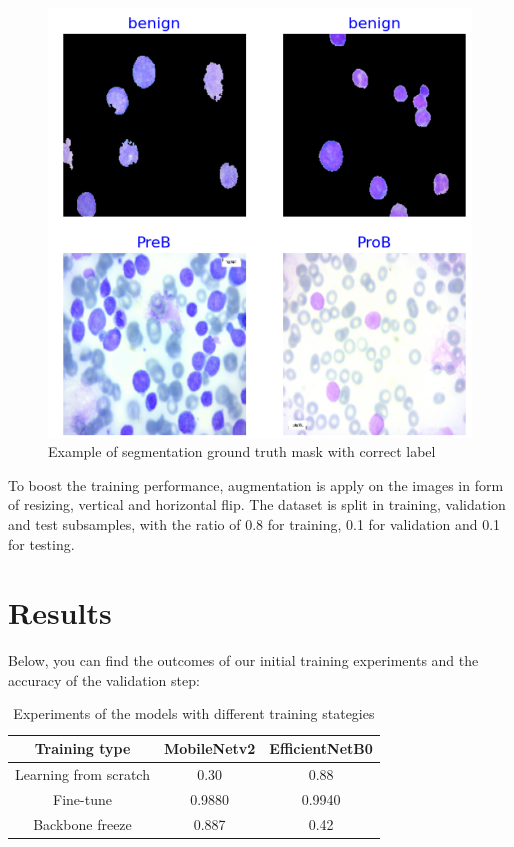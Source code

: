\documentclass[runningheads,a4paper,11pt]{report}
\begin{document}
\begin{figure}[h]
    \centering
    \includegraphics[scale=0.5]{images/samples.png} 
    \caption{Example of segmentation ground truth mask with correct label}
\end{figure}

To boost the training performance, augmentation is apply on the images in form of resizing, vertical and horizontal flip. The dataset is split in training, validation and test subsamples, with the ratio of 0.8 for training, 0.1 for validation and 0.1 for testing. 



\section{Results}
\label{section:results}

Below, you can find the outcomes of our initial training experiments and the accuracy of the validation step:

\begin{table}[htb]
\centering
\begin{tabular}{|c|c|c|}
\hline
\textbf{Training type} & \textbf{MobileNetv2} & \textbf{EfficientNetB0} \\
\hline
Learning from scratch & 0.30 & 0.88 \\
\hline
Fine-tune & 0.9880 & 0.9940 \\
\hline
Backbone freeze & 0.887 & 0.42 \\
\hline
\end{tabular}
\caption{Experiments of the models with different training stategies}
\label{tab:results_sgd}
\end{table}
\end{document}
